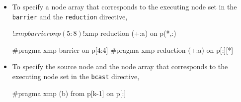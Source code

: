 \begin{itemize}
\item To specify a node array that corresponds to the executing node set
      in the {\tt barrier} and the {\tt reduction} directive,\\


\begin{minipage}{0.43\hsize}
\begin{center}
\begin{XFexample}
!$xmp barrier on p(5:8)
!$xmp reduction (+:a) on p(*,:)
\end{XFexample}
\end{center}
\end{minipage}
%
\begin{minipage}{0.54\hsize}
\begin{center}
\begin{XCexampleR}
#pragma xmp barrier on p[4:4]
#pragma xmp reduction (+:a) on p[:][*]
\end{XCexampleR}
\end{center}
\end{minipage}

\item To specify the source node and the node array that corresponds to
      the executing node set in the {\tt bcast} directive,\\


\begin{minipage}{0.43\hsize}
\begin{center}
\end{center}
\end{minipage}
%
\begin{minipage}{0.54\hsize}
\begin{center}
\begin{XCexampleR}
#pragma xmp (b) from p[k-1] on p[:]
\end{XCexampleR}
\end{center}
\end{minipage}

\end{itemize}

